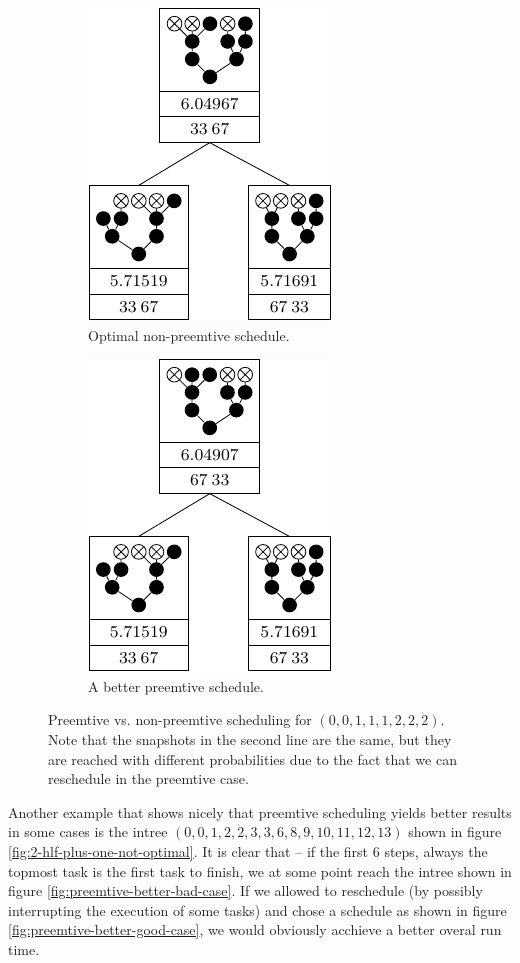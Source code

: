 \begin{figure}[ht]
  \centering
  \begin{subfigure}{.45\linewidth}
    \centering
    \includegraphics{p3/preemtive/0012233345_nonpreemtive.pdf}
    \caption{Optimal non-preemtive schedule.}
  \end{subfigure}
  \quad
  \begin{subfigure}{.45\linewidth}
    \centering
    \includegraphics{p3/preemtive/0012233345_preemtive.pdf}
    \caption{A better preemtive schedule.}
  \end{subfigure}
  \caption{Preemtive vs. non-preemtive scheduling for $(0,0,1,1,1,2,2,2)$. Note that the snapshots in the second line are the same, but they are reached with different probabilities due to the fact that we can reschedule in the preemtive case.}
  \label{fig:preemtive-example-00111222}
\end{figure}

Another example that shows nicely that preemtive scheduling yields better results in some cases is the intree $(0,0,1,2,2,3,3,6,8,9,10,11,12,13)$ shown in figure \ref{fig:2-hlf-plus-one-not-optimal}. It is clear that -- if the first 6 steps, always the topmost task is the first task to finish, we at some point reach the intree shown in figure \ref{fig:preemtive-better-bad-case}. If we allowed to reschedule (by possibly interrupting the execution of some tasks) and chose a schedule as shown in figure \ref{fig:preemtive-better-good-case}, we would obviously acchieve a better overal run time. 

